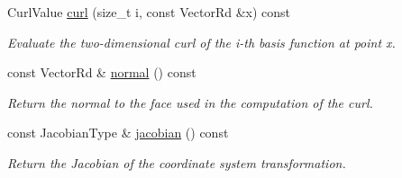 \begin{DoxyCompactItemize}
Curl\+Value \hyperlink{classHArDCore3D_1_1MonomialScalarBasisFace_aadba906ff906d86d97cfcc1a5fbc505f}{curl} (size\+\_\+t i, const Vector\+Rd \&x) const
\begin{DoxyCompactList}\small\item\em Evaluate the two-\/dimensional curl of the i-\/th basis function at point x. \end{DoxyCompactList}\item 
\mbox{\label{classHArDCore3D_1_1MonomialScalarBasisFace_a299c04e82954cd6bd69a31de664d1150}} 
const Vector\+Rd \& \hyperlink{classHArDCore3D_1_1MonomialScalarBasisFace_a299c04e82954cd6bd69a31de664d1150}{normal} () const
\begin{DoxyCompactList}\small\item\em Return the normal to the face used in the computation of the curl. \end{DoxyCompactList}\item 
\mbox{\label{classHArDCore3D_1_1MonomialScalarBasisFace_aa8a841d7f31dd65d0dc3aeae6d3283c6}} 
const Jacobian\+Type \& \hyperlink{classHArDCore3D_1_1MonomialScalarBasisFace_aa8a841d7f31dd65d0dc3aeae6d3283c6}{jacobian} () const
\begin{DoxyCompactList}\small\item\em Return the Jacobian of the coordinate system transformation. \end{DoxyCompactList}\end{DoxyCompactItemize}
